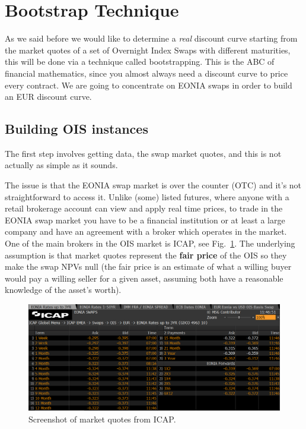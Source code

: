 \section{Bootstrap Technique}\label{bootstrapping-technique}

As we said before we would like to determine a \emph{real} discount
curve starting from the market quotes of a set of Overnight Index Swaps
with different maturities, this will be done via a technique called
bootstrapping. This is the ABC of financial mathematics, since you
almost always need a discount curve to price every contract. We are
going to concentrate on EONIA swaps in order to build an EUR discount
curve.

\subsection{Building OIS instances}\label{building-ois-instances}

The first step involves getting data, the swap market quotes, and this is not actually as simple as it sounds.

The issue is that the EONIA swap market is over the counter (OTC) and it's not straightforward to access it. Unlike (some) listed futures, where anyone with a retail brokerage account can view and apply real time prices, to trade in the EONIA swap market you have to be a financial institution or at least a large company and have an agreement with a broker which operates in the market. One of the main brokers in the OIS market is ICAP, see Fig.~\ref{fig:icap}.
The underlying assumption is that market quotes represent the \textbf{fair price} of the OIS so they make the swap NPVs null (the fair price is an estimate of what a willing buyer would pay a willing seller for a given asset, assuming both have a reasonable knowledge of the asset's worth).

\begin{figure}[bth]
  \centering
\includegraphics[width=1.\linewidth]{figures/icap_3.png}
\caption{Screenshot of market quotes from ICAP.}
\label{fig:icap}
\end{figure}

